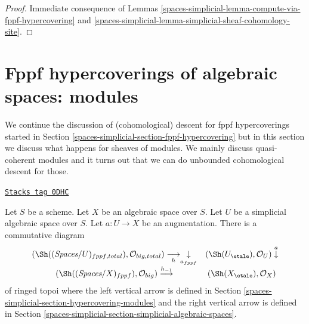 \begin{proof}
Immediate consequence of Lemmas \ref{spaces-simplicial-lemma-compute-via-fppf-hypercovering}
and \ref{spaces-simplicial-lemma-simplicial-sheaf-cohomology-site}.
\end{proof}

\section{Fppf hypercoverings of algebraic spaces: modules}
\label{spaces-simplicial-section-fppf-hypercovering-modules}
We continue the discussion of (cohomological) descent for fppf hypercoverings
started in Section \ref{spaces-simplicial-section-fppf-hypercovering}
but in this section we discuss what happens for sheaves of modules.
We mainly discuss quasi-coherent modules and it turns out that
we can do unbounded cohomological descent for those.

\begin{lemma}
\label{spaces-simplicial-lemma-compare-simplicial-objects-fppf-etale-modules}
\href{https://stacks.math.columbia.edu/tag/0DHC}{\texttt{Stacks tag 0DHC}}

Let $S$ be a scheme. Let $X$ be an algebraic space over $S$.
Let $U$ be a simplicial algebraic space over $S$.
Let $a : U \to X$ be an augmentation. There is a commutative diagram
$$
\begin{array}{cc}(\Sh((\textit{Spaces}/U)_{fppf, total}), \mathcal{O}_{big, total})
\underset{h}{\longrightarrow}\underset{a_{fppf}}{\downarrow} & (\Sh(U_\etale), \mathcal{O}_U) \overset{a}{\downarrow} \\ (\Sh((\textit{Spaces}/X)_{fppf}), \mathcal{O}_{big}) \overset{h_{-1}}{\longrightarrow} & (\Sh(X_\etale), \mathcal{O}_X)\end{array}
$$
of ringed topoi where the left vertical arrow is defined in
Section \ref{spaces-simplicial-section-hypercovering-modules}
and the right vertical arrow is defined in
Section \ref{spaces-simplicial-section-simplicial-algebraic-spaces}.
\end{lemma}

